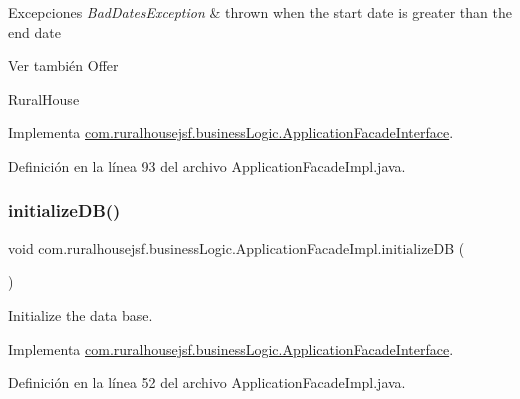 \begin{DoxyExceptions}{Excepciones}
{\em Bad\+Dates\+Exception} & thrown when the start date is greater than the end date\\
\hline
\end{DoxyExceptions}
\begin{DoxySeeAlso}{Ver también}
Offer 

Rural\+House 
\end{DoxySeeAlso}


Implementa \mbox{\hyperlink{a00136_a1ce3b82ceb8bda252ff3a54bab3e1c69}{com.\+ruralhousejsf.\+business\+Logic.\+Application\+Facade\+Interface}}.



Definición en la línea 93 del archivo Application\+Facade\+Impl.\+java.

\mbox{\label{a00132_a1e6cbb70c9568899c86135b3264b431d}} 
\subsubsection{\texorpdfstring{initializeDB()}{initializeDB()}}
{\footnotesize\ttfamily void com.\+ruralhousejsf.\+business\+Logic.\+Application\+Facade\+Impl.\+initialize\+DB (\begin{DoxyParamCaption}{ }\end{DoxyParamCaption})}



Initialize the data base. 



Implementa \mbox{\hyperlink{a00136_a4670319006cee17060e0c84695d7195f}{com.\+ruralhousejsf.\+business\+Logic.\+Application\+Facade\+Interface}}.



Definición en la línea 52 del archivo Application\+Facade\+Impl.\+java.

\mbox{\label{a00132_a7af883dece6a0de1e1be2b83e3d4a23f}} 
